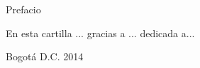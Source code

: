 \newpage
\vfill
\begin{center}
\begin{Huge}
Prefacio
\end{Huge}
\vfill
\par

En esta cartilla ... gracias a ... dedicada a...
\par

\vfill
Bogotá D.C. 2014

\end{center}
\vfill